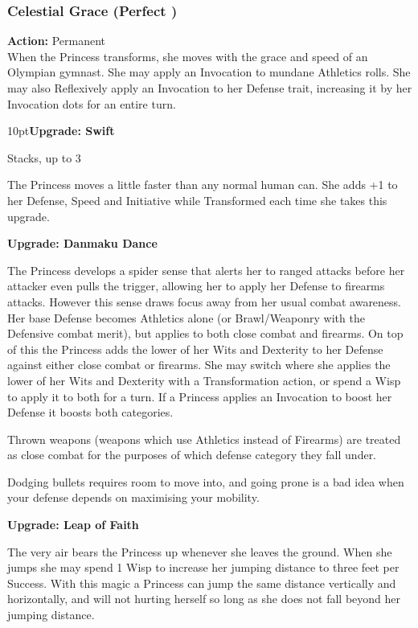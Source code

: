 \subsubsection*{Celestial Grace (Perfect \textbullet)}

\noindent \textbf{Action:} Permanent \\

\noindent When the Princess transforms, she moves with the grace and speed of an Olympian gymnast. She may apply an Invocation to mundane Athletics rolls. She may also Reflexively apply an Invocation to her Defense trait, increasing it by her Invocation dots for an entire turn. 

\begin{myindentpar}{10pt}\textbf{Upgrade: Swift}

Stacks, up to 3

The Princess moves a little faster than any normal human can. She adds +1 to her Defense, Speed and Initiative while Transformed each time she takes this upgrade.

\textbf{Upgrade: Danmaku Dance}

The Princess develops a spider sense that alerts her to ranged attacks before her attacker even pulls the trigger, allowing her to apply her Defense to firearms attacks. However this sense draws focus away from her usual combat awareness. Her base Defense becomes Athletics alone (or Brawl/Weaponry with the Defensive combat merit), but applies to both close combat and firearms. On top of this the Princess adds the lower of her Wits and Dexterity to her Defense against either close combat or firearms. She may switch where she applies the lower of her Wits and Dexterity with a Transformation action, or spend a Wisp to apply it to both for a turn. If a Princess applies an Invocation to boost her Defense it boosts both categories. 

Thrown weapons (weapons which use Athletics instead of Firearms) are treated as close combat for the purposes of which defense category they fall under. 

Dodging bullets requires room to move into, and going prone is a bad idea when your defense depends on maximising your mobility. 

\textbf{Upgrade: Leap of Faith}

The very air bears the Princess up whenever she leaves the ground. When she jumps she may spend 1 Wisp to increase her jumping distance to three feet per Success. With this magic a Princess can jump the same distance vertically and horizontally, and will not hurting herself so long as she does not fall beyond her jumping distance. 


\end{myindentpar}
